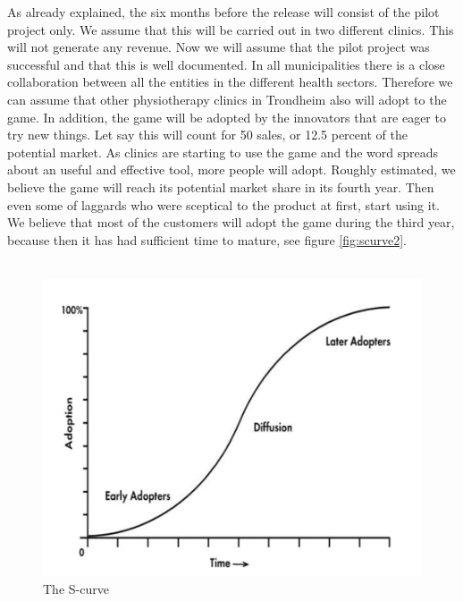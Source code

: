 As already explained, the six months before the release will consist of the pilot project only. We assume that this will be carried out in two different clinics. This will not generate any revenue. Now we will assume that the pilot project was successful and that this is well documented. In all municipalities there is a close collaboration between all the entities in the different health sectors. Therefore we can assume that other physiotherapy clinics in Trondheim also will adopt to the game. In addition, the game will be adopted by the innovators that are eager to try new things. Let say this will count for 50 sales, or 12.5 percent of the potential market. As clinics are starting to use the game and the word spreads about an useful and effective tool, more people will adopt. Roughly estimated, we believe the game will reach its potential market share in its fourth year. Then even some of laggards who were sceptical to the product at first, start using it. We believe that most of the customers will adopt the game during the third year, because then it has had sufficient time to mature, see figure \ref{fig:scurve2}. \\ \\ 
\begin{figure}
\begin{center}
\includegraphics[scale=0.4]{scurve}
\caption[The S-curve]{The S-curve \cite{scurve}}
\label{fig:scurve}
\end{center}
\end{figure}
